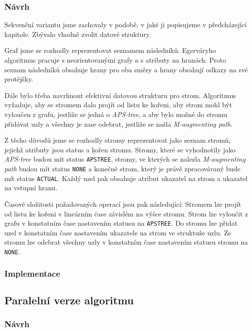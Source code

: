 \documentclass[a4paper, 12pt, titlepage, final]{article}[3. prosinec 2011]
\begin{document}
\subsubsection*{Návrh}

Sekvenční variantu jsme zachovaly v podobě, v jaké ji popisujeme v předcházející kapitole. Zbývalo vhodně zvolit datové struktury. 

Graf jsme se rozhodly reprezentovat seznamem následníků. Egerváryho algoritmus pracuje s neorientovanými grafy a s atributy na hranách. Proto seznam následníků obsahuje hrany pro oba směry a hrany obsahují odkazy na své protějšky.

Dále bylo třeba navrhnout efektivní datovou strukturu pro strom. Algoritmus vyžaduje, aby se stromem dalo projít od listu ke kořeni, aby strom mohl být vyloučen z grafu, jestliže se jedná o \textit{APS-tree}, a aby bylo možné do stromu přidávat uzly a všechny je zase odebrat, jestliže se našla \textit{M-augmenting path}. 

Z těcho důvodů jsme se rozhodly stromy reprezentovat jako seznam stromů, jejichž atributy jsou status a kořen stromu. Stromy, které se vyhodnotily jako \textit{APS-tree} budou mít status \texttt{APSTREE}, stromy, ve kterých se nalezla \textit{M-augmenting path} budou mít status \texttt{NONE} a konečně strom, který je právě zpracovávaný bude mít status \texttt{ACTUAL}. Každý uzel pak obsahuje atribut ukazatel na strom a ukazatel na vstupní hranu.

Časové složitosti požadovaných operací jsou pak následující: Stromem lze projít od listu ke kořeni v lineárním čase závislém na výšce stromu. Strom lze vyloučit z grafu v konstatním čase nastavením statusu na \texttt{APSTREE}. Do stromu lze přidat uzel v konstatním čase nastavením ukazatele na strom ve struktuže uzlu. Ze stromu lze odebrat všechny uzly v konstatním čase nastavením statusu stromu na \texttt{NONE}.

\subsubsection*{Implementace}

\subsection{Paralelní verze algoritmu}

\subsubsection*{Návrh}
\end{document}
